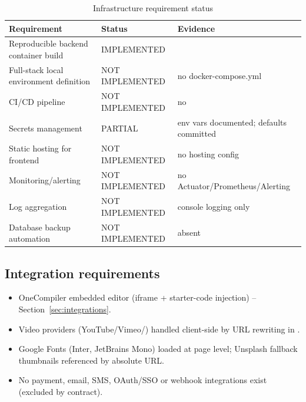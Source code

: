 \begin{table}[H]
\centering
\caption{Infrastructure requirement status}
\label{tab:infra-reqs}
\begin{tabular}{@{}L{6.4cm}C{3.2cm}L{3.4cm}@{}}
\toprule
\textbf{Requirement} & \textbf{Status} & \textbf{Evidence} \\
\midrule
Reproducible backend container build & IMPLEMENTED &  \\
Full-stack local environment definition & NOT IMPLEMENTED & no docker-compose.yml \\
CI/CD pipeline & NOT IMPLEMENTED & no  \\
Secrets management & PARTIAL & env vars documented; defaults committed \\
Static hosting for frontend & NOT IMPLEMENTED & no hosting config \\
Monitoring/alerting & NOT IMPLEMENTED & no Actuator/Prometheus/Alerting \\
Log aggregation & NOT IMPLEMENTED & console logging only \\
Database backup automation & NOT IMPLEMENTED & absent \\
\bottomrule
\end{tabular}
\end{table}

\subsection{Integration requirements}
\begin{itemize}
    \item OneCompiler embedded editor (iframe +  starter-code injection) -- Section~\ref{sec:integrations}.
    \item Video providers (YouTube/Vimeo/) handled client-side by URL rewriting in .
    \item Google Fonts (Inter, JetBrains Mono) loaded at page level; Unsplash fallback thumbnails referenced by absolute URL.
    \item No payment, email, SMS, OAuth/SSO or webhook integrations exist (excluded by contract).
\end{itemize}

